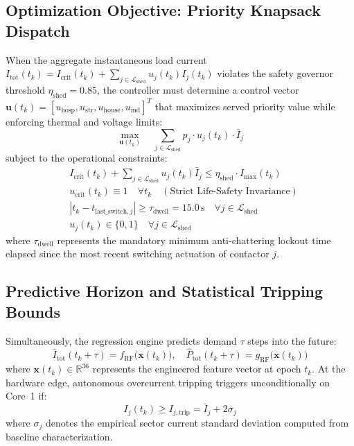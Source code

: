 \documentclass[journal,10pt,twocolumn]{IEEEtran}
\begin{document}
\subsection{Optimization Objective: Priority Knapsack Dispatch}
When the aggregate instantaneous load current $I_{\text{tot}}(t_k) = I_{\text{crit}}(t_k) + \sum_{j \in \mathcal{L}_{\text{shed}}} u_j(t_k) I_j(t_k)$ violates the safety governor threshold $\eta_{\text{shed}} = 0.85$, the controller must determine a control vector $\mathbf{u}(t_k) = [u_{\text{hosp}}, u_{\text{str}}, u_{\text{house}}, u_{\text{ind}}]^T$ that maximizes served priority value while enforcing thermal and voltage limits:
\begin{equation}
\max_{\mathbf{u}(t_k)} \quad \sum_{j \in \mathcal{L}_{\text{shed}}} p_j \cdot u_j(t_k) \cdot \bar{I}_j
\label{eq:knapsack_obj}
\end{equation}
subject to the operational constraints:
\begin{align}
& I_{\text{crit}}(t_k) + \sum_{j \in \mathcal{L}_{\text{shed}}} u_j(t_k) \bar{I}_j \le \eta_{\text{shed}} \cdot I_{\max}(t_k) \label{eq:const_cap} \\
& u_{\text{crit}}(t_k) \equiv 1 \quad \forall t_k \quad (\text{Strict Life-Safety Invariance}) \label{eq:const_crit} \\
& |t_k - t_{\text{last\_switch}, j}| \ge \tau_{\text{dwell}} = 15.0\,\text{s} \quad \forall j \in \mathcal{L}_{\text{shed}} \label{eq:const_dwell} \\
& u_j(t_k) \in \{0, 1\} \quad \forall j \in \mathcal{L}_{\text{shed}}
\end{align}
where $\tau_{\text{dwell}}$ represents the mandatory minimum anti-chattering lockout time elapsed since the most recent switching actuation of contactor $j$.

\subsection{Predictive Horizon and Statistical Tripping Bounds}
Simultaneously, the regression engine predicts demand $\tau$ steps into the future:
\begin{equation}
\hat{I}_{\text{tot}}(t_k + \tau) = f_{\text{RF}}\big(\mathbf{x}(t_k)\big), \quad \hat{P}_{\text{tot}}(t_k + \tau) = g_{\text{RF}}\big(\mathbf{x}(t_k)\big)
\label{eq:forecasting_form}
\end{equation}
where $\mathbf{x}(t_k) \in \mathbb{R}^{36}$ represents the engineered feature vector at epoch $t_k$. At the hardware edge, autonomous overcurrent tripping triggers unconditionally on Core~1 if:
\begin{equation}
I_j(t_k) \ge I_{j, \text{trip}} = \bar{I}_j + 2\sigma_j
\label{eq:edge_trip_rule}
\end{equation}
where $\sigma_j$ denotes the empirical sector current standard deviation computed from baseline characterization.
\end{document}
